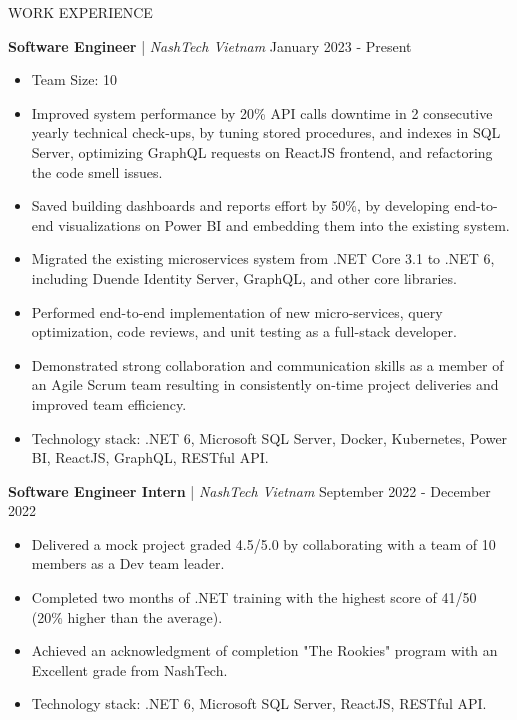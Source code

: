 \begin{rSection}{WORK EXPERIENCE}

      \quad\textbf{Software Engineer} | \textit{NashTech Vietnam} \hfill January 2023 - Present\\
      \begin{itemize}
            \itemsep 0pt {} \vspace{-1em}
            \item Team Size: 10
            \item Improved system performance by 20\% API calls downtime in 2 consecutive yearly technical check-ups,
                  by tuning stored procedures, and indexes in SQL Server, optimizing GraphQL requests on ReactJS frontend,
                  and refactoring the code smell issues.
            \item Saved building dashboards and reports effort by 50\%, by developing end-to-end visualizations on Power BI
                  and embedding them into the existing system.
            \item Migrated the existing microservices system from .NET Core 3.1 to .NET 6,
                  including Duende Identity Server, GraphQL, and other core libraries.
            \item Performed end-to-end implementation of new micro-services, query optimization,
                  code reviews, and unit testing as a full-stack developer.
            \item Demonstrated strong collaboration and communication skills as a member of an Agile Scrum team
                  resulting in consistently on-time project deliveries and improved team efficiency.
            \item Technology stack: .NET 6, Microsoft SQL Server, Docker, Kubernetes, Power BI, ReactJS, GraphQL, RESTful API.
      \end{itemize}

      \vspace{1em}

      \quad\textbf{Software Engineer Intern} | \textit{NashTech Vietnam} \hfill September 2022 - December 2022\\
      \begin{itemize}
            \itemsep 0pt {} \vspace{-1em}
            \item Delivered a mock project graded 4.5/5.0 by collaborating with a team of 10 members as a Dev team leader.
            \item Completed two months of .NET training with the highest score of 41/50 (20\% higher than the average).
            \item Achieved an acknowledgment of completion "The Rookies" program with an Excellent grade from NashTech.
            \item Technology stack: .NET 6, Microsoft SQL Server, ReactJS, RESTful API.
      \end{itemize}


\end{rSection}
